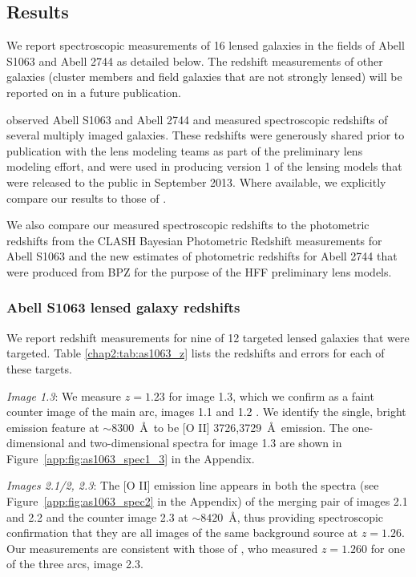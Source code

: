 \subsection{Results}

We report spectroscopic measurements of 16 lensed galaxies in the fields of Abell S1063 and Abell 2744 as detailed below.  The redshift measurements of other galaxies (cluster members and field galaxies that are not strongly lensed) will be reported on in a future publication.

\citet{Richard:2014gf} observed Abell S1063 and Abell 2744 and measured spectroscopic redshifts of several multiply imaged galaxies. These redshifts were generously shared prior to publication with the lens modeling teams as part of the preliminary lens modeling effort, and were used in producing version 1 of the lensing models that were released to the public in September 2013. Where available, we explicitly compare our results to those of \citet{Richard:2014gf}.

We also compare our measured spectroscopic redshifts to the photometric redshifts from the CLASH Bayesian Photometric Redshift \citep[BPZ;][]{Benitez:2000uq,Benitez:2004fj,Coe:2006xy} measurements for Abell S1063 and the new estimates of photometric redshifts for Abell 2744 that were produced from BPZ for the purpose of the HFF preliminary lens models. 

\subsubsection{Abell S1063 lensed galaxy redshifts}

We report redshift measurements for nine of 12 targeted lensed galaxies that were targeted. Table \ref{chap2:tab:as1063_z} lists the redshifts and errors for each of these targets.

\textit{Image 1.3}: We measure $z=1.23$ for image 1.3, which we confirm as a faint counter image of the main arc, images 1.1 and 1.2 \citep[$z=1.229$,][]{Richard:2014gf}. We identify the single, bright emission feature at $\sim8300$~\AA\ to be [O II] 3726,3729~\AA\ emission. The one-dimensional and two-dimensional spectra for image 1.3 are shown in Figure~\ref{app:fig:as1063_spec1_3} in the Appendix.

\textit{Images 2.1/2, 2.3}: The [O II] emission line appears in both the spectra (see Figure~\ref{app:fig:as1063_spec2} in the Appendix) of the merging pair of images 2.1 and 2.2 and the counter image 2.3 at $\sim8420$~\AA, thus providing spectroscopic confirmation that they are all images of the same background source at $z=1.26$. Our measurements are consistent with those of  \citet{Richard:2014gf}, who measured $z=1.260$ for one of the three arcs, image 2.3.

